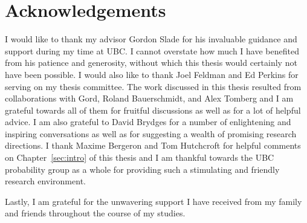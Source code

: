 {%
\let\oldnumberline\numberline%
\renewcommand{\numberline}{\figurename~\oldnumberline}%
\listoffigures%
}

\cleardoublepage



\chapter{Acknowledgements}      %
I would like to thank my advisor Gordon Slade for his invaluable guidance and support
during my time at UBC. I cannot overstate how much I have benefited
from his patience and generosity, without which this thesis would certainly not have
been possible. I would also like to thank Joel Feldman and Ed Perkins for serving on my
thesis committee. The work discussed in this thesis resulted from collaborations with
Gord, Roland Bauerschmidt, and Alex Tomberg and I am grateful towards all of them for
fruitful discussions as well as for a lot of helpful advice. I am also grateful
to David Brydges for a number of enlightening and inspiring conversations as well as for
suggesting a wealth of promising research directions. I thank Maxime Bergeron and
Tom Hutchcroft for helpful comments on Chapter~\ref{sec:intro} of this thesis and I am
thankful towards the UBC probability group as a whole for providing such a stimulating
and friendly research environment.

Lastly, I am grateful for the unwavering support I have received from my family and friends
throughout the course of my studies.
